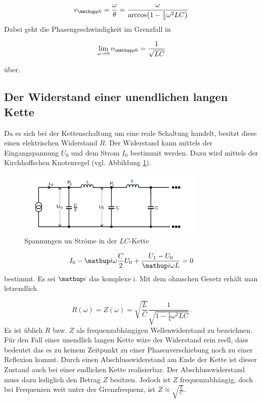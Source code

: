 \begin{equation}
\label{eq:phasen_esc}
v\ua{ph}=\frac{\omega}{\theta}=\frac{\omega}{\arccos\!\left(1-\frac{1}{2}\omega^2LC\right)}
\end{equation}
Dabei geht die Phasengeschwindigkeit im Grenzfall in

\begin{equation*}
\lim_{\omega\to 0}v\ua{ph}=\frac{1}{\sqrt{LC}}
\end{equation*}

über.
\subsection{Der Widerstand einer unendlichen langen Kette}
Da es sich bei der Kettenschaltung um eine reale Schaltung handelt,
besitzt diese einen elektrischen Widerstand $R$.
Der Widerstand kann mittels der Eingangspannung $U_0$ und dem Strom $I_0$ bestimmit werden.
Dazu wird mittels der Kirchhoffschen Knotenregel (vgl. Abbildung \ref{fig:bestimmung_impe}).
\begin{figure}
  \centering
  \includegraphics[width=0.8\textwidth]{bilder/eigenimpendanz.png}
  \caption{Spannungen un Ströme in der $LC$-Kette}
  \label{fig:bestimmung_impe}
\end{figure}
\begin{equation*}
I_0 - \map{i}\omega\frac{C}{2}U_0+\frac{U_1-U_0}{\map{i}\omega L}=0
\end{equation*}
bestimmt.
Es sei $\map{i}$ das komplexe i.
Mit dem ohmschen Gesetz erhält man letzendlich

\begin{equation}
R(\omega)=Z(\omega)=\sqrt{\frac{L}{C}}\frac{1}{\sqrt{1-\frac{1}{4}\omega^2LC}}.
\end{equation}
Es ist üblich $R$ bzw. $Z$ als frequenzabhängigen Wellenwiderstand zu bezeichnen.
Für den Fall einer unendlich langen Kette wäre der Widerstand rein reell, dass bedeutet 
das es zu keinem Zeitpunkt zu einer Phasenverschiebung noch zu einer Reflexion kommt.
Durch einen Abschlusswiderstand am Ende der Kette ist dieser Zustand auch bei einer endlichen Kette 
realisierbar. Der Abschlusswiderstand muss dazu lediglich den Betrag $Z$ besitzen.
Jedoch ist $Z$ frequenzabhängig, doch bei Frequenzen weit unter der Grenzfrequenz, ist 
$Z\approx \sqrt{\frac{L}{C}}$.

